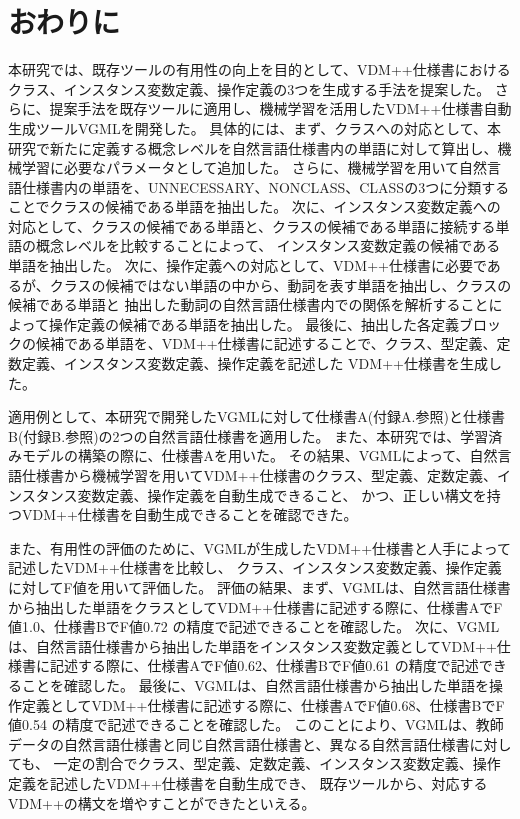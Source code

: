 \chapter{おわりに}\label{cha:Conclusion}

本研究では、既存ツールの有用性の向上を目的として、VDM++仕様書におけるクラス、インスタンス変数定義、操作定義の3つを生成する手法を提案した。
さらに、提案手法を既存ツールに適用し、機械学習を活用したVDM++仕様書自動生成ツールVGMLを開発した。
具体的には、まず、クラスへの対応として、本研究で新たに定義する概念レベルを自然言語仕様書内の単語に対して算出し、機械学習に必要なパラメータとして追加した。
さらに、機械学習を用いて自然言語仕様書内の単語を、UNNECESSARY、NONCLASS、CLASSの3つに分類することでクラスの候補である単語を抽出した。
次に、インスタンス変数定義への対応として、クラスの候補である単語と、クラスの候補である単語に接続する単語の概念レベルを比較することによって、
インスタンス変数定義の候補である単語を抽出した。
次に、操作定義への対応として、VDM++仕様書に必要であるが、クラスの候補ではない単語の中から、動詞を表す単語を抽出し、クラスの候補である単語と
抽出した動詞の自然言語仕様書内での関係を解析することによって操作定義の候補である単語を抽出した。
最後に、抽出した各定義ブロックの候補である単語を、VDM++仕様書に記述することで、クラス、型定義、定数定義、インスタンス変数定義、操作定義を記述した
VDM++仕様書を生成した。

適用例として、本研究で開発したVGMLに対して仕様書A(付録A.参照)と仕様書B(付録B.参照)の2つの自然言語仕様書を適用した。
また、本研究では、学習済みモデルの構築の際に、仕様書Aを用いた。
その結果、VGMLによって、自然言語仕様書から機械学習を用いてVDM++仕様書のクラス、型定義、定数定義、インスタンス変数定義、操作定義を自動生成できること、
かつ、正しい構文を持つVDM++仕様書を自動生成できることを確認できた。

また、有用性の評価のために、VGMLが生成したVDM++仕様書と人手によって記述したVDM++仕様書を比較し、
クラス、インスタンス変数定義、操作定義に対してF値を用いて評価した。
評価の結果、まず、VGMLは、自然言語仕様書から抽出した単語をクラスとしてVDM++仕様書に記述する際に、仕様書AでF値1.0、仕様書BでF値0.72
の精度で記述できることを確認した。
次に、VGMLは、自然言語仕様書から抽出した単語をインスタンス変数定義としてVDM++仕様書に記述する際に、仕様書AでF値0.62、仕様書BでF値0.61
の精度で記述できることを確認した。
最後に、VGMLは、自然言語仕様書から抽出した単語を操作定義としてVDM++仕様書に記述する際に、仕様書AでF値0.68、仕様書BでF値0.54
の精度で記述できることを確認した。
このことにより、VGMLは、教師データの自然言語仕様書と同じ自然言語仕様書と、異なる自然言語仕様書に対しても、
一定の割合でクラス、型定義、定数定義、インスタンス変数定義、操作定義を記述したVDM++仕様書を自動生成でき、
既存ツールから、対応するVDM++の構文を増やすことができたといえる。

